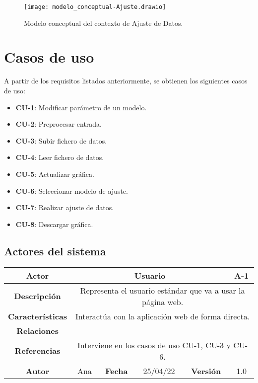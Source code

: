\begin{figure}[!h]
\begin{center}
\caption{Modelo conceptual del contexto de Ajuste de Datos.}
\label{diag: modelo_concep_ajuste}
\texttt{[image: modelo\_conceptual-Ajuste.drawio]}
\end{center}
\end{figure}





\section{Casos de uso}

A partir de los requisitos listados anteriormente, se obtienen los siguientes casos de uso:

\begin{itemize}
\item \textbf{CU-1}: Modificar parámetro de un modelo.
\item \textbf{CU-2}: Preprocesar entrada.
\item \textbf{CU-3}: Subir fichero de datos.
\item \textbf{CU-4}: Leer fichero de datos.
\item \textbf{CU-5}: Actualizar gráfica.
\item \textbf{CU-6}: Seleccionar modelo de ajuste.
\item \textbf{CU-7}: Realizar ajuste de datos.
\item \textbf{CU-8}: Descargar gráfica.
\end{itemize}

\subsection{Actores del sistema}

\begin{table}[!h]
\begin{tabular}{|c|c|c|c|c|c|c|c|}
\hline
 \rowcolor{azulillo} \textbf{Actor} & \multicolumn{6}{|c|}{Usuario} & {A-1} \\
\hline
 \cellcolor{azulillo} \textbf{Descripción}              & \multicolumn{7}{|c|}{Representa el usuario estándar que va a usar la página web.}           \\
\hline
 \cellcolor{azulillo} \textbf{Características}                 & \multicolumn{7}{|c|}{Interactúa con la aplicación web de forma directa.}             \\
\hline
 \cellcolor{azulillo} \textbf{Relaciones}         & \multicolumn{7}{|c|}{}             \\
\hline
\cellcolor{azulillo} \textbf{Referencias}        & \multicolumn{7}{|c|}{Interviene en los casos de uso CU-1, CU-3 y CU-6.}              \\
\hline
\cellcolor{azulillo} \textbf{Autor}                &   Ana  & \multicolumn{2}{|c|}{\cellcolor{azulillo} \textbf{Fecha}} &  25/04/22   & \multicolumn{2}{|c|}{\cellcolor{azulillo} \textbf{Versión}} & 1.0  \\
\hline
\end{tabular}
\end{table}


